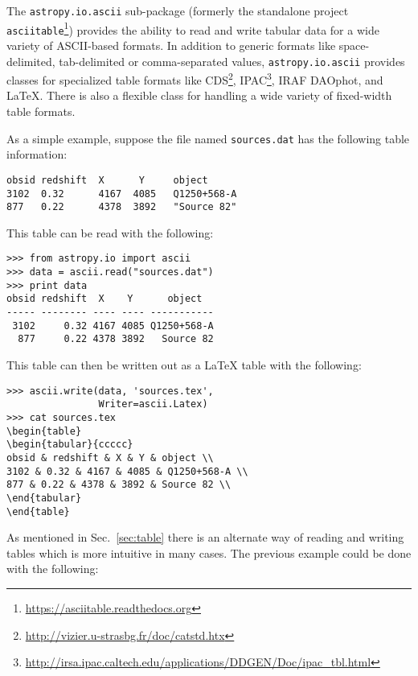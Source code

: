 \documentclass[traditabstract]{aa}
\begin{document}
The \texttt{astropy.io.ascii} sub-package (formerly the standalone project
\texttt{asciitable}\footnote{\url{https://asciitable.readthedocs.org}}) provides the
ability to read and write tabular data for a wide variety of ASCII-based
formats.  In addition to generic formats like space-delimited, tab-delimited or
comma-separated values, \texttt{astropy.io.ascii} provides classes for specialized
table formats like
CDS\footnote{\url{http://vizier.u-strasbg.fr/doc/catstd.htx}},
IPAC\footnote{\url{http://irsa.ipac.caltech.edu/applications/DDGEN/Doc/ipac_tbl.html}},
IRAF DAOphot, and LaTeX.  There is also a flexible class for handling
a wide variety of fixed-width table formats.

As a simple example, suppose the file named \verb|sources.dat| has the following
table information:

\begin{verbatim}
obsid redshift  X      Y     object
3102  0.32      4167  4085   Q1250+568-A
877   0.22      4378  3892   "Source 82"
\end{verbatim}

This table can be read with the following:

\begin{verbatim}
>>> from astropy.io import ascii
>>> data = ascii.read("sources.dat")
>>> print data
obsid redshift  X    Y      object
----- -------- ---- ---- -----------
 3102     0.32 4167 4085 Q1250+568-A
  877     0.22 4378 3892   Source 82
\end{verbatim}

This table can then be written out as a LaTeX table with the following:

\begin{verbatim}
>>> ascii.write(data, 'sources.tex',
                Writer=ascii.Latex)
>>> cat sources.tex
\begin{table}
\begin{tabular}{ccccc}
obsid & redshift & X & Y & object \\
3102 & 0.32 & 4167 & 4085 & Q1250+568-A \\
877 & 0.22 & 4378 & 3892 & Source 82 \\
\end{tabular}
\end{table}
\end{verbatim}

As mentioned in Sec.~\ref{sec:table} there is an alternate way of
reading and writing tables which is more intuitive in many cases.
The previous example could be done with the following:
\end{document}

